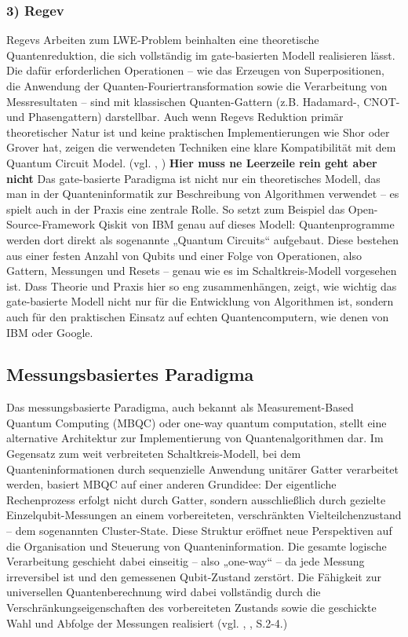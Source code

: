 \subsubsection*{3) Regev}
Regevs Arbeiten zum LWE-Problem beinhalten eine theoretische Quantenreduktion, die sich vollständig im gate-basierten Modell realisieren lässt. Die dafür erforderlichen Operationen – wie das Erzeugen von Superpositionen, die Anwendung der Quanten-Fouriertransformation sowie die Verarbeitung von Messresultaten – sind mit klassischen Quanten-Gattern (z.B. Hadamard-, CNOT- und Phasengattern) darstellbar. Auch wenn Regevs Reduktion primär theoretischer Natur ist und keine praktischen Implementierungen wie Shor oder Grover hat, zeigen die verwendeten Techniken eine klare Kompatibilität mit dem Quantum Circuit Model.
(vgl. \citeauthor{regev_lattices_2024}, \citeyear{regev_lattices_2024})
\textbf{Hier muss ne Leerzeile rein geht aber nicht}
Das gate-basierte Paradigma ist nicht nur ein theoretisches Modell, das man in der Quanteninformatik zur Beschreibung von Algorithmen verwendet – es spielt auch in der Praxis eine zentrale Rolle. So setzt zum Beispiel das Open-Source-Framework Qiskit von IBM genau auf dieses Modell: Quantenprogramme werden dort direkt als sogenannte „Quantum Circuits“ aufgebaut. Diese bestehen aus einer festen Anzahl von Qubits und einer Folge von Operationen, also Gattern, Messungen und Resets – genau wie es im Schaltkreis-Modell vorgesehen ist.
Dass Theorie und Praxis hier so eng zusammenhängen, zeigt, wie wichtig das gate-basierte Modell nicht nur für die Entwicklung von Algorithmen ist, sondern auch für den praktischen Einsatz auf echten Quantencomputern, wie denen von IBM oder Google.

\subsection{Messungsbasiertes Paradigma}
Das messungsbasierte Paradigma, auch bekannt als Measurement-Based Quantum Computing (MBQC) oder one-way quantum computation, stellt eine alternative Architektur zur Implementierung von Quantenalgorithmen dar. Im Gegensatz zum weit verbreiteten Schaltkreis-Modell, bei dem Quanteninformationen durch sequenzielle Anwendung unitärer Gatter verarbeitet werden, basiert MBQC auf einer anderen Grundidee: Der eigentliche Rechenprozess erfolgt nicht durch Gatter, sondern ausschließlich durch gezielte Einzelqubit-Messungen an einem vorbereiteten, verschränkten Vielteilchenzustand – dem sogenannten Cluster-State.
Diese Struktur eröffnet neue Perspektiven auf die Organisation und Steuerung von Quanteninformation. Die gesamte logische Verarbeitung geschieht dabei einseitig – also „one-way“ – da jede Messung irreversibel ist und den gemessenen Qubit-Zustand zerstört. Die Fähigkeit zur universellen Quantenberechnung wird dabei vollständig durch die Verschränkungseigenschaften des vorbereiteten Zustands sowie die geschickte Wahl und Abfolge der Messungen realisiert (vgl. \citeauthor{h_j_briegel_measurement-based_2009}, \citeyear{h_j_briegel_measurement-based_2009}, S.2-4.)
